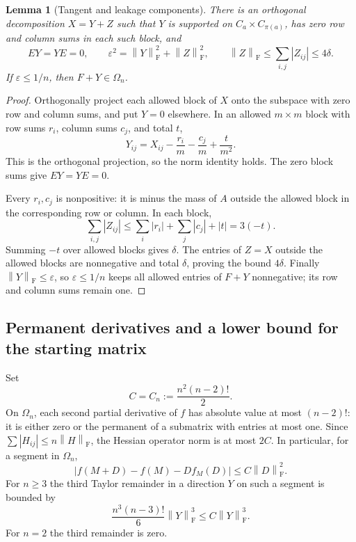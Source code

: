 \documentclass[11pt]{article}
\newtheorem{lemma}[theorem]{Lemma}
\theoremstyle{remark}\newtheorem{remark}[theorem]{Remark}
\newcommand{\Om}{\Omega_n}
\newcommand{\fn}[1]{\left\|#1\right\|_{\mathrm F}}
\newcommand{\eps}{\varepsilon}
\begin{document}
\begin{lemma}[Tangent and leakage components]\label{lem:split}
There is an orthogonal decomposition $X=Y+Z$ such that $Y$ is supported
on $C_a\times C_{\pi(a)}$, has zero row and column sums in each such
block, and
\begin{equation}\label{eq:splitbounds}
 EY=YE=0,\qquad
 \eps^2=\fn Y^2+\fn Z^2,\qquad
 \fn Z\le\sum_{i,j}|Z_{ij}|\le4\delta.
\end{equation}
If $\eps\le1/n$, then $F+Y\in\Om$.
\end{lemma}
\begin{proof}
Orthogonally project each allowed block of $X$ onto the subspace with
zero row and column sums, and put $Y=0$ elsewhere. In an allowed
$m\times m$ block with row sums $r_i$, column sums $c_j$, and total $t$,
\[
 Y_{ij}=X_{ij}-\frac{r_i}{m}-\frac{c_j}{m}+\frac{t}{m^2}.
\]
This is the orthogonal projection, so the norm identity holds.
The zero block sums give $EY=YE=0$.

Every $r_i,c_j$ is nonpositive: it is minus the mass of $A$ outside the
allowed block in the corresponding row or column. In each block,
\[
 \sum_{i,j}|Z_{ij}|
 \le\sum_i|r_i|+\sum_j|c_j|+|t|=3(-t).
\]
Summing $-t$ over allowed blocks gives $\delta$. The entries of $Z=X$
outside the allowed blocks are nonnegative and total $\delta$, proving
the bound $4\delta$. Finally $\fn Y\le\eps$, so $\eps\le1/n$ keeps
all allowed entries of $F+Y$ nonnegative; its row and column sums remain
one.
\end{proof}

\subsection{Permanent derivatives and a lower bound for the starting matrix}
Set
\begin{equation}\label{eq:C}
 C=C_n:=\frac{n^2(n-2)!}{2}.
\end{equation}
On $\Om$, each second partial derivative of $f$ has absolute value at
most $(n-2)!$: it is either zero or the permanent of a submatrix with
entries at most one. Since $\sum|H_{ij}|\le n\fn H$, the Hessian
operator norm is at most $2C$. In particular, for a segment in $\Om$,
\begin{equation}\label{eq:taylor2}
 |f(M+D)-f(M)-Df_M(D)|\le C\fn D^2.
\end{equation}
For $n\ge3$ the third Taylor remainder in a direction $Y$ on such a
segment is bounded by
\[
 \frac{n^3(n-3)!}{6}\fn Y^3\le C\fn Y^3.
\]
For $n=2$ the third remainder is zero.
\end{document}
